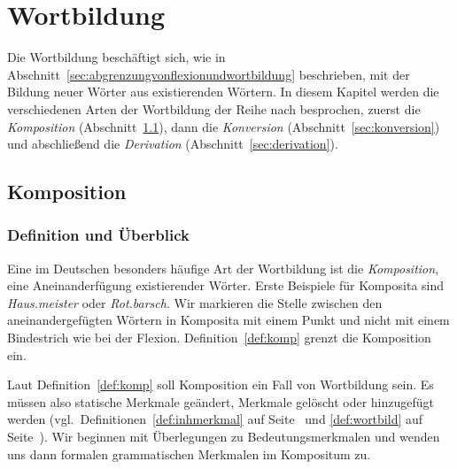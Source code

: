 \chapter{Wortbildung}
\label{sec:wortbildung}

Die Wortbildung beschäftigt sich, wie in Abschnitt~\ref{sec:abgrenzungvonflexionundwortbildung} beschrieben, mit der Bildung neuer Wörter aus existierenden Wörtern.
In diesem Kapitel werden die verschiedenen Arten der Wortbildung der Reihe nach besprochen, zuerst die \textit{Komposition} (Abschnitt~\ref{sec:komposition}), dann die \textit{Konversion} (Abschnitt~\ref{sec:konversion}) und abschließend die \textit{Derivation} (Abschnitt~\ref{sec:derivation}).

\section{Komposition}
\label{sec:komposition}

\subsection{Definition und Überblick}
\label{sec:definitionundueberblick}


Eine im Deutschen besonders häufige Art der Wortbildung ist die \textit{Komposition}, eine Aneinanderfügung existierender Wörter.
Erste Beispiele für Komposita sind \textit{Haus.meister} oder \textit{Rot.barsch}.
Wir markieren die Stelle zwischen den aneinandergefügten Wörtern in Komposita mit einem Punkt und nicht mit einem Bindestrich wie bei der Flexion.
Definition~\ref{def:komp} grenzt die Komposition ein.


Laut Definition~\ref{def:komp} soll Komposition ein Fall von Wortbildung sein.
Es müssen also statische Merkmale geändert, Merkmale gelöscht oder hinzugefügt werden (vgl.\ Definitionen~\ref{def:inhmerkmal} auf Seite~\pageref{def:inhmerkmal} und \ref{def:wortbild} auf Seite~\pageref{def:wortbild}).
Wir beginnen mit Überlegungen zu Bedeutungsmerkmalen und wenden uns dann formalen grammatischen Merkmalen im Kompositum zu.


